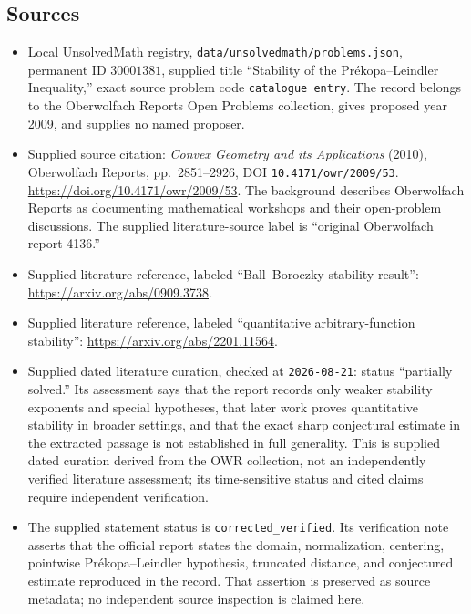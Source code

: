 \documentclass[11pt]{article}
\begin{document}
\subsection{Sources}
\begin{itemize}
\item Local UnsolvedMath registry, \texttt{data/unsolvedmath/problems.json}, permanent ID \(30001381\), supplied title ``Stability of the Pr\'ekopa--Leindler Inequality,'' exact source problem code \texttt{catalogue entry}. The record belongs to the Oberwolfach Reports Open Problems collection, gives proposed year 2009, and supplies no named proposer.
\item Supplied source citation: \emph{Convex Geometry and its Applications} (2010), Oberwolfach Reports, pp.~2851--2926, DOI \texttt{10.4171/owr/2009/53}. \url{https://doi.org/10.4171/owr/2009/53}. The background describes Oberwolfach Reports as documenting mathematical workshops and their open-problem discussions. The supplied literature-source label is ``original Oberwolfach report 4136.''
\item Supplied literature reference, labeled ``Ball--Boroczky stability result'': \url{https://arxiv.org/abs/0909.3738}.
\item Supplied literature reference, labeled ``quantitative arbitrary-function stability'': \url{https://arxiv.org/abs/2201.11564}.
\item Supplied dated literature curation, checked at \texttt{2026-08-21}: status ``partially solved.'' Its assessment says that the report records only weaker stability exponents and special hypotheses, that later work proves quantitative stability in broader settings, and that the exact sharp conjectural estimate in the extracted passage is not established in full generality. This is supplied dated curation derived from the OWR collection, not an independently verified literature assessment; its time-sensitive status and cited claims require independent verification.
\item The supplied statement status is \texttt{corrected\_verified}. Its verification note asserts that the official report states the domain, normalization, centering, pointwise Pr\'ekopa--Leindler hypothesis, truncated distance, and conjectured estimate reproduced in the record. That assertion is preserved as source metadata; no independent source inspection is claimed here.
\end{itemize}
\end{document}
